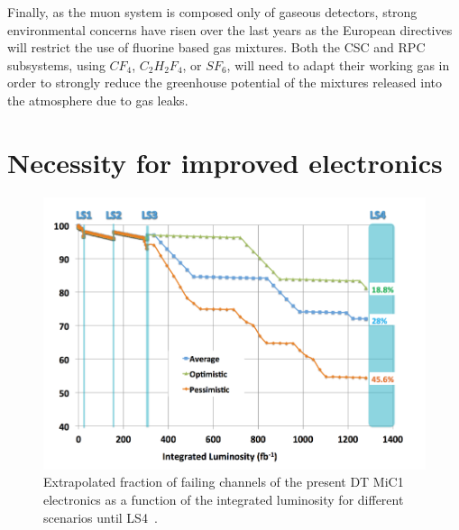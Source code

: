 	Finally, as the muon system is composed only of gaseous detectors, strong environmental concerns have risen over the last years as the European directives will restrict the use of fluorine based gas mixtures. Both the CSC and RPC subsystems, using $CF_4$, $C_2H_2F_4$, or $SF_6$, will need to adapt their working gas in order to strongly reduce the greenhouse potential of the mixtures released into the atmosphere due to gas leaks.
	
\endgroup
		
\section{Necessity for improved electronics}
\label{chapt4:sec:electronics}

\begingroup\setlength{\intextsep}{0pt}\setlength{\columnsep}{15pt}

	\begin{figure}
		\centering
		\includegraphics[width=\linewidth]{fig/chapt4/DT-channel-failure.png}
		\caption{\label{fig:DT-failure} Extrapolated fraction of failing channels of the present DT MiC1 electronics as a function of the integrated luminosity for different scenarios until LS4~\cite{PHASEIITP}.}
	\end{figure}

